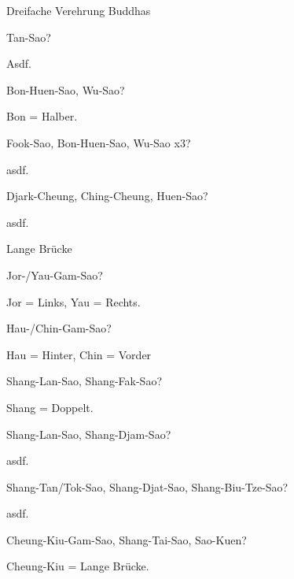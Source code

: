 
\begin{WTSatz}{Dreifache Verehrung Buddhas}%
	
	
	\begin{WTSatzTeil}{Tan-Sao}{?}
		
		Asdf.
	\end{WTSatzTeil}
	\begin{WTSatzTeil}{Bon-Huen-Sao, Wu-Sao}{?}
		
		Bon = Halber.
	\end{WTSatzTeil}
	\begin{WTSatzTeil}{Fook-Sao, Bon-Huen-Sao, Wu-Sao x3}{?}
		
		asdf.
	\end{WTSatzTeil}
	\begin{WTSatzTeil}{Djark-Cheung, Ching-Cheung, Huen-Sao}{?}
		
		asdf.
	\end{WTSatzTeil}
\end{WTSatz}


\begin{WTSatz}{Lange Br\"ucke}%
	\begin{WTSatzTeil}{Jor-/Yau-Gam-Sao}{?}
		
		Jor = Links, Yau = Rechts.
	\end{WTSatzTeil}
	\begin{WTSatzTeil}{Hau-/Chin-Gam-Sao}{?}
		
		Hau = Hinter, Chin = Vorder
	\end{WTSatzTeil}
	\begin{WTSatzTeil}{Shang-Lan-Sao, Shang-Fak-Sao}{?}
		
		Shang = Doppelt.
	\end{WTSatzTeil}
	\begin{WTSatzTeil}{Shang-Lan-Sao, Shang-Djam-Sao}{?}
		
		asdf.
	\end{WTSatzTeil}
	\begin{WTSatzTeil}{Shang-Tan/Tok-Sao, Shang-Djat-Sao, Shang-Biu-Tze-Sao}{?}
		
		asdf.
	\end{WTSatzTeil}
	\begin{WTSatzTeil}{Cheung-Kiu-Gam-Sao, Shang-Tai-Sao, Sao-Kuen}{?}
		
		Cheung-Kiu = Lange Br\"ucke.
	\end{WTSatzTeil}
\end{WTSatz}

